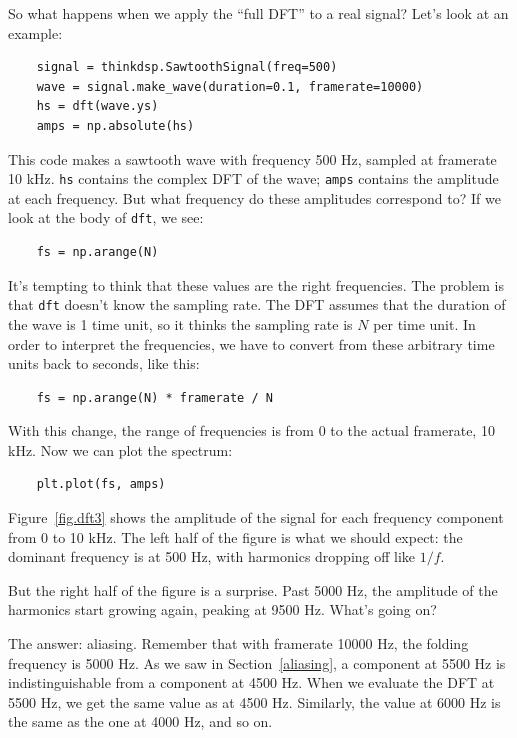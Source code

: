 \documentclass[12pt]{book}
\begin{document}
So what happens when we apply the ``full DFT'' to a real signal?
Let's look at an example:

\begin{verbatim}
    signal = thinkdsp.SawtoothSignal(freq=500)
    wave = signal.make_wave(duration=0.1, framerate=10000)
    hs = dft(wave.ys)
    amps = np.absolute(hs)
\end{verbatim}

This code makes a sawtooth wave with frequency 500 Hz, sampled at
framerate 10 kHz.  {\tt hs} contains the complex DFT of the wave;
{\tt amps} contains the amplitude at each frequency.  But what
frequency do these amplitudes correspond to?  If we look at the
body of {\tt dft}, we see:

\begin{verbatim}
    fs = np.arange(N)
\end{verbatim}

It's tempting to think that these values are the right frequencies.
The problem is that {\tt dft} doesn't know the sampling rate.  The DFT
assumes that the duration of the wave is 1 time unit, so it thinks the
sampling rate is $N$ per time unit.  In order to interpret the
frequencies, we have to convert from these arbitrary time units back
to seconds, like this:

\begin{verbatim}
    fs = np.arange(N) * framerate / N
\end{verbatim}

With this change, the range of frequencies is from 0 to the actual
framerate, 10 kHz.  Now we can plot the spectrum:

\begin{verbatim}
    plt.plot(fs, amps)
\end{verbatim}

Figure~\ref{fig.dft3} shows the amplitude of the signal for each
frequency component from 0 to 10 kHz.  The left half of the figure
is what we should expect: the dominant frequency is at 500 Hz, with
harmonics dropping off like $1/f$.

But the right half of the figure is a surprise.  Past 5000 Hz, the
amplitude of the harmonics start growing again, peaking at 9500 Hz.
What's going on?

The answer: aliasing.  Remember that with framerate 10000 Hz, the
folding frequency is 5000 Hz.  As we saw in Section~\ref{aliasing},
a component at 5500 Hz is indistinguishable from a component
at 4500 Hz.  When we evaluate the DFT at 5500 Hz, we get the same
value as at 4500 Hz.  Similarly, the value at 6000 Hz is the same
as the one at 4000 Hz, and so on.
\end{document}
